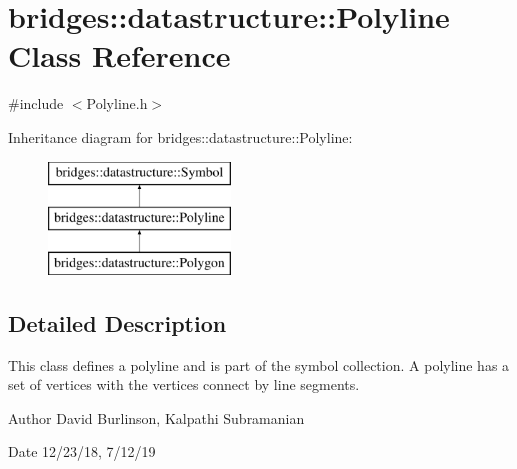 \hypertarget{classbridges_1_1datastructure_1_1_polyline}{}\section{bridges\+:\+:datastructure\+:\+:Polyline Class Reference}
\label{classbridges_1_1datastructure_1_1_polyline}


{\ttfamily \#include $<$Polyline.\+h$>$}

Inheritance diagram for bridges\+:\+:datastructure\+:\+:Polyline\+:\begin{figure}[H]
\begin{center}
\leavevmode
\includegraphics[height=3.000000cm]{classbridges_1_1datastructure_1_1_polyline}
\end{center}
\end{figure}


\subsection{Detailed Description}
This class defines a polyline and is part of the symbol collection. A polyline has a set of vertices with the vertices connect by line segments. 

\begin{DoxyAuthor}{Author}
David Burlinson, Kalpathi Subramanian 
\end{DoxyAuthor}
\begin{DoxyDate}{Date}
12/23/18, 7/12/19 
\end{DoxyDate}
